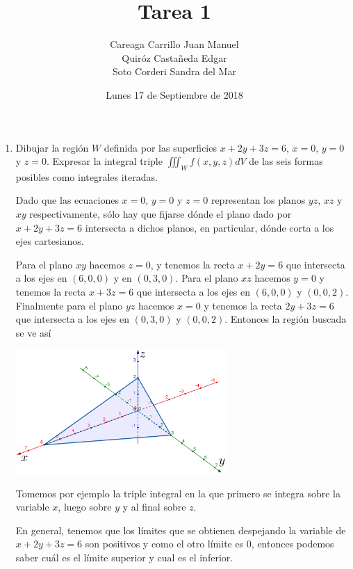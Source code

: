 \documentclass{article}
\begin{document}
    \title{Tarea 1}
    \author{Careaga Carrillo Juan Manuel \\ Quiróz Castañeda Edgar \\ Soto Corderi Sandra del Mar}
    \date{Lunes 17 de Septiembre de 2018}
    \maketitle

	\begin{enumerate}
   	\item {
        Dibujar la región $W$ definida por las superficies $x + 2y + 3z = 6$,
        $x = 0$, $y = 0$ y $z = 0$.
        Expresar la integral triple $\iiint_Wf(x,y,z)dV$ de las seis formas posibles
        como integrales iteradas.

        \color{azul}
        Dado que las ecuaciones $x=0$, $y=0$ y $z=0$ representan los planos $yz$, $xz$ y $xy$
        respectivamente, sólo hay que fijarse dónde el plano dado por $x+2y+3z=6$ intersecta a dichos
        planos, en particular, dónde corta a los ejes cartesianos.

        Para el plano $xy$ hacemos $z=0$, y tenemos la recta $x+2y=6$ que intersecta a los ejes en $(6,0,0)$
        y en $(0,3,0)$. Para el plano $xz$ hacemos $y=0$ y tenemos la recta $x+3z=6$ que intersecta a los ejes
        en $(6,0,0)$ y $(0,0,2)$. Finalmente para el plano $yz$ hacemos $x=0$ y tenemos la recta $2y+3z=6$
        que intersecta a los ejes en $(0,3,0)$ y $(0,0,2)$. Entonces la región buscada se ve así
        \begin{center}
            \includegraphics[width=8cm]{img/Ej1_3D.png}
        \end{center}
        Tomemos por ejemplo la triple integral en la que primero se integra sobre la
        variable $x$, luego sobre $y$ y al final sobre $z$.

        En general, tenemos que los límites que se obtienen despejando la
        variable de $x + 2y + 3z = 6$ son positivos y como el otro límite es 0,
        entonces podemos saber cuál es el límite superior y cual es el inferior.

}
\end{enumerate}
\end{document}
